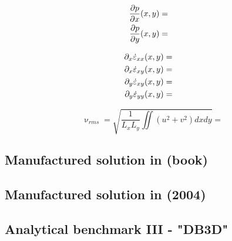 \begin{eqnarray}
\frac{\partial p}{\partial x} (x,y)&=& \nonumber\\
\frac{\partial p}{\partial y} (x,y)&=& \nonumber
\end{eqnarray}

\begin{eqnarray}
\partial_x \dot\varepsilon_{xx} (x,y)&=& \nonumber\\
\partial_x \dot\varepsilon_{xy} (x,y)&=& \nonumber\\
\partial_y \dot\varepsilon_{xy} (x,y)&=& \nonumber\\
\partial_y \dot\varepsilon_{yy} (x,y)&=& \nonumber
\end{eqnarray}

\[
\upnu_{rms}=\sqrt{ \frac{1}{L_xL_y} \iint (u^2+v^2) dxdy   } = 
\]


\subsection{Manufactured solution in \textcite{dohu03} (book) \label{mms1}}


\subsection{Manufactured solution in \textcite{dobo04} (2004) \label{ss:mms2}}


\subsection{Analytical benchmark III \label{mms3} - "DB3D"}

